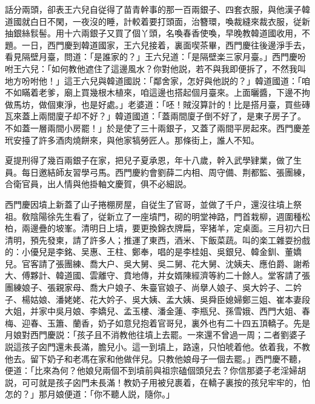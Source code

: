 話分兩頭，卻表王六兒自従得了苗青幹事的那一百兩銀子、四套衣服，與他漢子韓道國就白日不閑，一夜沒的睡，計較着要打頭面，治簪環，喚裁縫來裁衣服，従新抽銀絲䯼髻。用十六兩銀子又買了個丫頭，名喚春香使喚，早晚教韓道國收用，不題。一日，西門慶到韓道國家，王六兒接着，裏面喫茶畢，西門慶往後邊淨手去，看見隔壁月臺，問道：「是誰家的？」王六兒道：「是隔壁楽三家月臺。」西門慶吩咐王六兒：「如何教他遮住了這邊風水？你對他説，若不與我即便拆了，不然我叫地方吩咐他！」這王六兒與韓道國説：「鄰舍家，怎好與他説的？」韓道國道：「咱不如瞞着老爹，廟上買幾根木植來，咱這邊也搭起個月臺來。上面曬醬，下邊不拘做馬坊，做個東淨，也是好處。」老婆道：「呸！賊沒算計的！比是搭月臺，買些磚瓦來蓋上兩間廈子却不好？」韓道國道：「蓋兩間廈子倒不好了，是東子房子了。不如蓋一層兩間小房罷！」於是使了三十兩銀子，又蓋了兩間平房起來。西門慶差玳安擡了許多酒肉燒餅來，與他家犒勞匠人。那條街上，誰人不知。

夏提刑得了幾百兩銀子在家，把兒子夏承恩，年十八歲，幹入武學肄業，做了生員。每日邀結師友習學弓馬。西門慶約會劉薛二内相、周守備、荆都監、張團練，合衛官員，出人情與他掛軸文慶賀，俱不必細説。

西門慶因墳上新蓋了山子捲棚房屋，自従生了官哥，並做了千户，還沒往墳上祭祖。敎陰陽徐先生看了，従新立了一座墳門，砌的明堂神路，門首栽柳，週圍種松柏，兩邊疊的坡峯。清明日上墳，要更換錦衣牌扁，宰猪羊，定桌面。三月初六日清明，預先發柬，請了許多人；推運了東西，酒米、下飯菜蔬。叫的楽工雜耍扮戲的：小優兒是李銘、吴惠、王柱、鄭奉，唱的是李桂姐、吳銀兒、韓金釧、董嬌兒。官客請了張團練、喬大户、吳大舅、吳二舅、花大舅、沈姨夫、應伯爵、謝希大、傅夥計、韓道國、雲離守、賁地傳，并女婿陳經濟等約二十餘人。堂客請了張團練娘子、張親家母、喬大户娘子、朱臺官娘子、尚擧人娘子、吳大妗子、二妗子、楊姑娘、潘姥姥、花大妗子、吳大姨、孟大姨、吳舜臣媳婦鄭三姐、崔本妻段大姐，并家中吳月娘、李嬌兒、孟玉樓、潘金蓮、李瓶兒、孫雪娥、西門大姐、春梅、迎春、玉簫、蘭香，奶子如意兒抱着官哥兒，裏外也有二十四五頂轎子。先是月娘對西門慶説：「孩子且不消教他往墳上去罷。一來還不曾過一周；二者劉婆子説這孩子囟門還未長滿，膽兒小。這一到墳上，路遠，只怕唬着他。依着我，不教他去。留下奶子和老馮在家和他做伴兒。只教他娘母子一個去罷。」西門慶不聽，便道：「比來為何？他娘兒兩個不到墳前與祖宗磕個頭兒去？你信那婆子老淫婦胡説，可可就是孩子囟門未長滿！教奶子用被兒裹着，在轎子裏按的孩兒牢牢的，怕怎的？」那月娘便道：「你不聽人説，隨你。」

